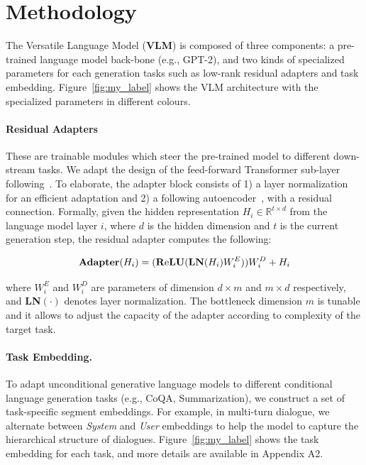 \section{Methodology}
The Versatile Language Model (\textbf{VLM}) is composed of three components: a pre-trained language model back-bone (e.g., GPT-2), and two kinds of specialized parameters for each generation tasks such as low-rank residual adapters and task embedding. Figure~\ref{fig:my_label} shows the VLM architecture with the specialized parameters in different colours.

\paragraph{Residual Adapters} These are trainable modules which steer the pre-trained model to different down-stream tasks. We adapt the design of the feed-forward Transformer sub-layer following~\citet{bapna2019simple}. To elaborate, the adapter block consists of 1) a layer normalization~\cite{ba2016layer} for an efficient adaptation and 2) a following autoencoder~\cite{hinton1994autoencoders}, with a residual connection. Formally, given the hidden representation $H_i \in \mathbb{R}^{t\times d}$ from the language model layer $i$, where $d$ is the hidden dimension and $t$ is the current generation step, the residual adapter computes the following:

\begin{equation}
\textrm{\textbf{Adapter}}(H_i) = (\textrm{\textbf{R}e\textbf{LU}} ( \textrm{\textbf{LN}}(H_i)W_i^{E} ))W_i^{D}  + H_i
\nonumber
\end{equation}

where $W_i^{E}$ and $W_i^{D}$ are parameters of dimension $d\times m$ and $m\times d$ respectively, and \textbf{LN}$(\cdot)$ denotes layer normalization. The bottleneck dimension $m$ is tunable and it allows to adjust the capacity of the adapter according to complexity of the target task. 

\paragraph{Task Embedding.} To adapt unconditional generative language models to different conditional language generation tasks (e.g., CoQA, Summarization), we construct a set of task-specific segment embeddings. For example, in multi-turn dialogue, we alternate between \textit{System} and \textit{User} embeddings to help the model to capture the hierarchical structure of dialogues. Figure~\ref{fig:my_label} shows the task embedding for each task, and more details are available in Appendix A2.

